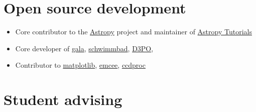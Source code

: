 \documentclass[12pt, letterpaper]{apw-cv}
\begin{document}
\begin{itemize}

\end{itemize}


\section*{Open source development \href{https://github.com/adrn}{\faGithub}}

\begin{itemize}

	\item Core contributor to the \href{http://www.astropy.org/}{Astropy} project and maintainer of \href{http://tutorials.astropy.org/}{Astropy Tutorials}
	\item Core developer of \href{http://gala.adrian.pw}{gala}, \href{https://github.com/adrn/schwimmbad}{schwimmbad}, \href{http://d3po.org}{D3PO},
	\item Contributor to \href{http://matplotlib.org/}{matplotlib}, \href{http://dan.iel.fm/emcee/current/}{emcee}, \href{https://github.com/astropy/ccdproc}{ccdproc}

\end{itemize}


\section*{Student advising}
\end{document}
